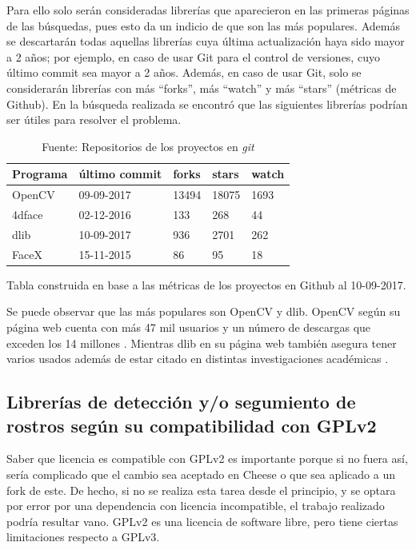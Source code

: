 \documentclass[a4paper,openright,12pt]{report}
\begin{document}
Para ello solo serán consideradas librerías que aparecieron en las primeras
páginas de las búsquedas, pues esto da un indicio de que son las más populares.
Además se descartarán todas aquellas librerías cuya última actualización haya
sido mayor a 2 años; por ejemplo, en caso de usar Git para el control de
versiones, cuyo último commit sea mayor a 2 años. Además, en caso de usar Git,
solo se considerarán librerías con más ``forks'', más ``watch'' y más ``stars''
(métricas de Github). En la búsqueda realizada se encontró que las siguientes
librerías podrían ser útiles para resolver el problema.

\begin{center}
	\begin{table}[h]
      \begin{tabular}{| l | l | l | l | l |}
      \hline
      Programa & último commit & forks & stars & watch \\ \hline
      OpenCV & 09-09-2017 & 13494 & 18075 & 1693 \\ \hline
      4dface & 02-12-2016 & 133 & 268 & 44 \\ \hline
      dlib & 10-09-2017 & 936 & 2701 & 262 \\ \hline
      FaceX & 15-11-2015 & 86 & 95 & 18 \\ \hline
      \end{tabular}
      \caption{Tabla construida en base a las métricas de los proyectos en Github
               al 10-09-2017.}
      \caption*{Fuente: Repositorios de los proyectos en \textit{git}}
	\end{table}
\end{center}

Se puede observar que las más populares son OpenCV y dlib. OpenCV según su
página web cuenta con más 47 mil usuarios y un número de descargas que exceden
los 14 millones \cite{OpenCV}. Mientras dlib en su página web también asegura
tener varios usados además de estar citado en distintas investigaciones
académicas \cite{dlibUsers}.

\subsection{Librerías de detección y/o segumiento de rostros según su
            compatibilidad con GPLv2}
Saber que licencia es compatible con GPLv2 es importante porque si no fuera así,
sería complicado que el cambio sea aceptado en Cheese o que sea aplicado a un
fork de este. De hecho, si no se realiza esta tarea desde el principio, y se
optara por error por una dependencia con licencia incompatible, el trabajo
realizado podría resultar vano. GPLv2 es una licencia de software libre, pero
tiene ciertas limitaciones respecto a GPLv3.
\end{document}
